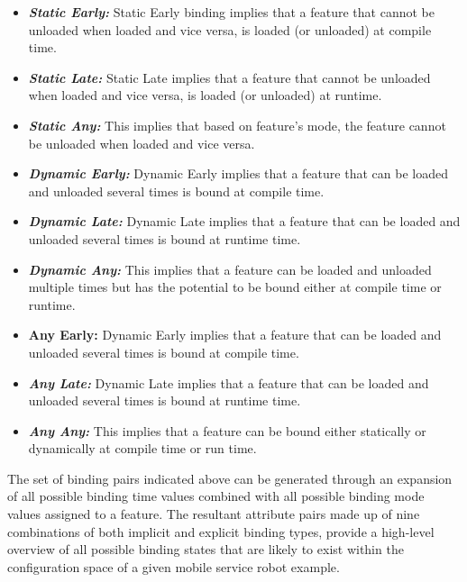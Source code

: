 \documentclass[conference]{IEEEtran}
\begin{document}
\begin{itemize}
    \item \textit{\textbf{Static Early:}} Static Early binding implies that a feature that cannot be unloaded when loaded and vice versa, is loaded (or unloaded) at compile time. 
    
    \item \textit{\textbf{Static Late:}} Static Late implies that a feature that cannot be unloaded when loaded and vice versa, is loaded (or unloaded) at runtime.
    
    \item \textit{\textbf{Static Any:}} This implies that based on feature's mode, the feature cannot be unloaded when loaded and vice versa.  
    
    \item \textit{\textbf{Dynamic Early:}} Dynamic Early implies that a feature that can be loaded and unloaded several times is bound at compile time.
    
    \item \textit{\textbf{Dynamic Late:}} Dynamic Late implies that a feature that can be loaded and unloaded several times is bound at runtime time.
    
    \item \textit{\textbf{Dynamic Any:}} This implies that a feature can be loaded and unloaded multiple times but has the potential to be bound either at compile time or runtime.
    
    \item \textbf{Any Early: }Dynamic Early implies that a feature that can be loaded and unloaded several times is bound at compile time.
    
    \item \textit{\textbf{Any Late:}} Dynamic Late implies that a feature that can be loaded and unloaded several times is bound at runtime time.
    
    \item \textit{\textbf{Any Any:}} This implies that a feature can be bound either statically or dynamically at compile time or run time. 
\end{itemize}

The set of binding pairs indicated above can be generated through an expansion of all possible binding time values combined with all possible binding mode values assigned to a feature. The resultant attribute pairs made up of nine combinations of both implicit and explicit binding types, provide a high-level overview of all possible binding states that are likely to exist within the configuration space of a given mobile service robot example. 
\end{document}

